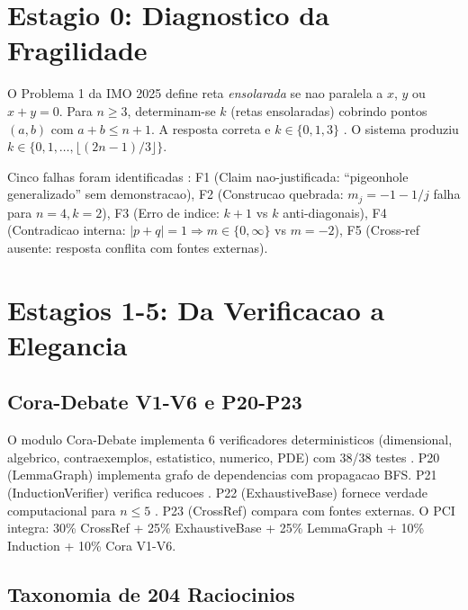 \documentclass[5p]{elsarticle}
\begin{document}
\section{Estagio 0: Diagnostico da Fragilidade}

O Problema 1 da IMO 2025 define reta \textit{ensolarada} se nao paralela a
$x$, $y$ ou $x+y=0$. Para $n\geq 3$, determinam-se $k$ (retas ensolaradas)
cobrindo pontos $(a,b)$ com $a+b\leq n+1$. A resposta correta e $k\in\{0,1,3\}$
\cite{chen2025,deepmind2025}. O sistema produziu $k\in\{0,1,\dots,\lfloor(2n-1)/3\rfloor\}$.

Cinco falhas foram identificadas \cite{corrigendum2026}: F1 (Claim nao-justificada:
``pigeonhole generalizado'' sem demonstracao), F2 (Construcao quebrada:
$m_j=-1-1/j$ falha para $n=4,k=2$), F3 (Erro de indice: $k+1$ vs $k$
anti-diagonais), F4 (Contradicao interna: $|p+q|=1\Rightarrow m\in\{0,\infty\}$
vs $m=-2$), F5 (Cross-ref ausente: resposta conflita com fontes externas).

\section{Estagios 1-5: Da Verificacao a Elegancia}

\subsection{Cora-Debate V1-V6 e P20-P23}

O modulo Cora-Debate implementa 6 verificadores deterministicos (dimensional,
algebrico, contraexemplos, estatistico, numerico, PDE) com 38/38 testes \cite{cora2026}.
P20 (LemmaGraph) implementa grafo de dependencias com propagacao BFS. P21
(InductionVerifier) verifica reducoes \cite{burstall1969}. P22 (ExhaustiveBase)
fornece verdade computacional para $n\leq 5$ \cite{clarke1999}. P23 (CrossRef)
compara com fontes externas. O PCI integra: 30\% CrossRef + 25\% ExhaustiveBase
+ 25\% LemmaGraph + 10\% Induction + 10\% Cora V1-V6.

\subsection{Taxonomia de 204 Raciocinios}
\end{document}
